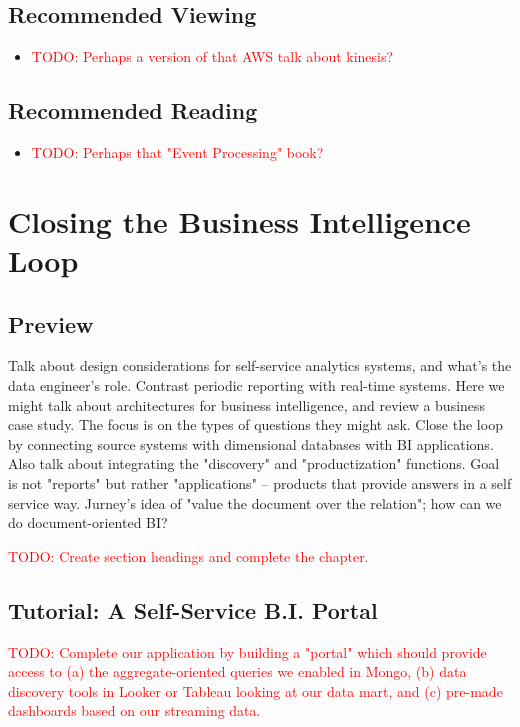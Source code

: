 \documentclass[11pt]{book}
\newcommand{\todo}[1]{\textcolor{red}{TODO: #1}} %
\begin{document}
\section*{Recommended Viewing}
\begin{itemize}
    \item \todo{Perhaps a version of that AWS talk about kinesis?}
\end{itemize}

\section*{Recommended Reading}
\begin{itemize}
    \item \todo{Perhaps that "Event Processing" book?}
\end{itemize}








\chapter{Closing the Business Intelligence Loop}

\section*{Preview}

Talk about design considerations for self-service analytics systems, and what's the data engineer's role.  Contrast periodic reporting with real-time systems.  Here we might talk about architectures for business intelligence, and review a business case study.  The focus is on the types of questions they might ask.  Close the loop by connecting source systems with dimensional databases with BI applications.  Also talk about integrating the "discovery" and "productization" functions.  Goal is not "reports" but rather "applications" -- products that provide answers in a self service way.  Jurney's idea of "value the document over the relation"; how can we do document-oriented BI?

\todo{Create section headings and complete the chapter.}

\section{Tutorial: A Self-Service B.I. Portal}

\todo{Complete our application by building a "portal" which should provide access to (a) the aggregate-oriented queries we enabled in Mongo, (b) data discovery tools in Looker or Tableau looking at our data mart, and (c) pre-made dashboards based on our streaming data.}
\end{document}
